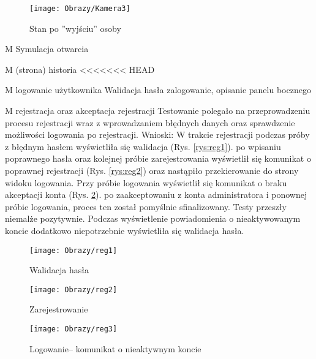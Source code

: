 \begin{enumerate*}
	\begin{figure}[ht!]
		\vspace{-1.7cm}
		\centering
		\texttt{[image: Obrazy/Kamera3]}
		\caption{Stan po ''wyjściu'' osoby}
		\label{rys:Kamera3}
	\end{figure}
\newpage
	\item M Symulacja otwarcia
	\item M (strona) historia
<<<<<<< HEAD
	\item M logowanie użytkownika
	Walidacja hasła 
	zalogowanie, 
	opisanie panelu bocznego
	\item M rejestracja oraz akceptacja rejestracji
	Testowanie polegało na przeprowadzeniu procesu rejestracji wraz z wprowadzaniem błędnych danych oraz sprawdzenie możliwości logowania po rejestracji.
	Wnioski: W trakcie rejestracji podczas próby z błędnym hasłem wyświetliła się walidacja (Rys. \ref{rys:reg1}). po wpisaniu poprawnego hasła oraz kolejnej próbie zarejestrowania wyświetlił się komunikat o poprawnej rejestracji (Rys. \ref{rys:reg2}) oraz nastąpiło przekierowanie do strony widoku logowania. Przy próbie logowania wyświetlił się komunikat o braku akceptacji konta (Rys. \ref{rys:reg3}). po zaakceptowaniu z konta administratora i ponownej próbie logowania, proces ten został pomyślnie sfinalizowany. Testy przeszły niemalże pozytywnie. Podczas wyświetlenie powiadomienia o nieaktywowanym koncie dodatkowo niepotrzebnie wyświetliła się walidacja hasła.   
	
		\begin{figure}[ht!]
		
		\begin{minipage}{0.2\textwidth}
			\texttt{[image: Obrazy/reg1]}
			\caption{Walidacja hasła }
			\label{rys:reg1}
		\end{minipage}
		\begin{minipage}{0.2\textwidth}
			\texttt{[image: Obrazy/reg2]}
			\caption{Zarejestrowanie}
			\label{rys:reg2}
		\end{minipage}
		
		\begin{minipage}{0.2\textwidth}
			\texttt{[image: Obrazy/reg3]}
			\caption{Logowanie-- komunikat o nieaktywnym koncie}
			\label{rys:reg3}
		\end{minipage}

	\end{figure}
	

\end{enumerate*}
